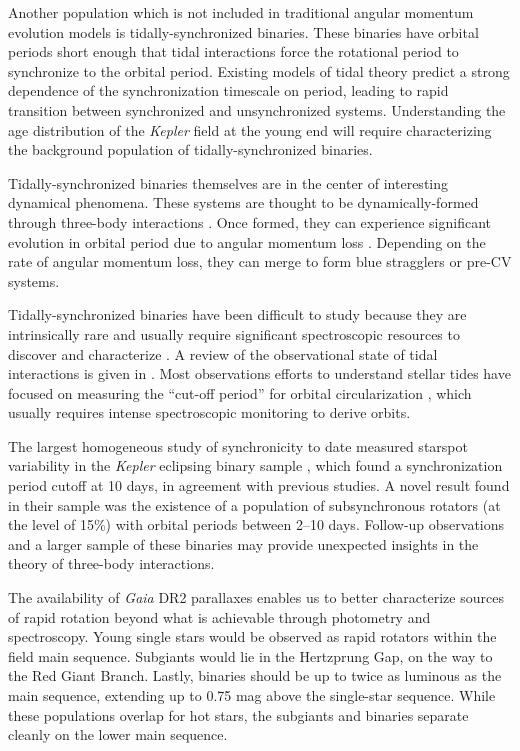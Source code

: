 \documentclass[twocolumn]{aastex6}
\newcommand{\Kepler}{\mbox{\textit{Kepler}}}
\newcommand{\Gaia}{\mbox{\textit{Gaia}}}
\begin{document}
Another population which is not included in traditional angular momentum
evolution models is tidally-synchronized binaries. These binaries have orbital 
periods short enough that tidal interactions force the rotational period to
synchronize to the orbital period. Existing models of tidal theory 
\citep{Zahn77} predict a strong dependence of the synchronization timescale 
on period, leading to rapid transition between
synchronized and unsynchronized systems. Understanding the 
age distribution of the \Kepler{} field at the young end will require 
characterizing the background population of tidally-synchronized binaries.

Tidally-synchronized binaries themselves are in the center of interesting
dynamical phenomena. These systems are thought to be dynamically-formed 
through three-body interactions \citep{Tokovinin06, Fabrycky07}. Once formed, they can experience significant
evolution in orbital period due to angular momentum loss \citep{Andronov06}.
Depending on the rate of angular momentum loss, they can merge to form blue 
stragglers or pre-CV systems.

Tidally-synchronized binaries have been difficult to study because they are 
intrinsically rare and usually require significant spectroscopic resources 
to discover and characterize \citep{Mathieu90, Raghavan10, Geller15}. A review 
of the observational state of tidal interactions is given in \citet{Mazeh08}. 
Most observations efforts to understand stellar tides have focused on 
measuring the ``cut-off period'' for orbital circularization \citep{Mayor84},
which usually requires intense spectroscopic monitoring to derive orbits.

The largest homogeneous study of synchronicity to date measured starspot 
variability in the \Kepler{} eclipsing binary sample \citep{Lurie17}, which 
found a synchronization period cutoff at 10 days, in agreement with previous studies. 
A novel result found in their sample was the existence of a population of
subsynchronous rotators (at the level of 15\%) with orbital periods between 
2--10 days. Follow-up observations and a larger sample of these binaries may 
provide unexpected insights in the theory of three-body interactions.

The availability of \Gaia{} DR2 parallaxes \citep{Gaia18,Lindegren18} 
enables us to better characterize sources of rapid rotation beyond what is
achievable through photometry and spectroscopy. Young single stars would be
observed as rapid rotators within the field main sequence. Subgiants would lie 
in the Hertzprung Gap, on the way to the Red Giant Branch. Lastly, binaries 
should be up to twice as luminous as the main sequence, extending up to 0.75 
mag above the single-star sequence.  While these populations overlap for hot 
stars, the subgiants and binaries separate cleanly on the lower main sequence.
\end{document}
